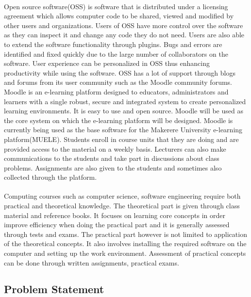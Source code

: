 \documentclass[12pt]{article}
\begin{document}
\paragraph{}Open source software(OSS) is software that is distributed under a licensing agreement which allows computer code to be shared, viewed and modified by other users and organizations. Users of OSS have more control over the software as they can inspect it and change any code they do not need. Users are also able to extend the software functionality through plugins. Bugs and errors are identified and fixed quickly due to the large number of collaborators on the software. User experience can be personalized in OSS thus enhancing productivity while using the software. OSS has a lot of support through blogs and forums from its user community such as the Moodle community forums. Moodle is an e-learning platform designed to educators, administrators and learners with a single robust, secure and integrated system to create personalized learning environments. It is easy to use and open source. Moodle will be used as the core system on which the e-learning platform will be designed. Moodle is currently being used as the base software for the Makerere University e-learning platform(MUELE). Students enroll in course units that they are doing and are provided access to the material on a weekly basis. Lecturers can also make communications to the students and take part in discussions about class problems. Assignments are also given to the students and sometimes also collected through the platform.
\paragraph{}Computing courses such as computer science, software engineering require both practical and theoretical knowledge. The theoretical part is given through class material and reference books. It focuses on learning core concepts in order improve efficiency when doing the practical part and it is generally assessed through tests and exams. The practical part however is not limited to application of the theoretical concepts. It also involves installing the required software on the computer and setting up the work environment. Assessment of practical concepts can be done through written assignments, practical exams.

	\subsection{Problem Statement}
	
\end{document}
